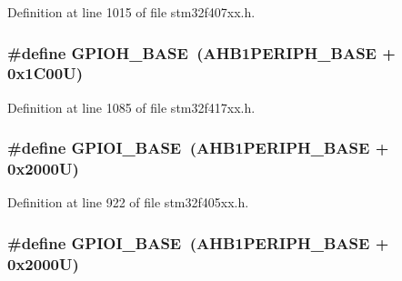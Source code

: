 Definition at line 1015 of file stm32f407xx.\+h.

\subsubsection[{\texorpdfstring{G\+P\+I\+O\+H\+\_\+\+B\+A\+SE}{GPIOH_BASE}}]{\setlength{\rightskip}{0pt plus 5cm}\#define G\+P\+I\+O\+H\+\_\+\+B\+A\+SE~({\bf A\+H\+B1\+P\+E\+R\+I\+P\+H\+\_\+\+B\+A\+SE} + 0x1\+C00\+U)}\hypertarget{group___peripheral__registers__structures_gaee4716389f3a1c727495375b76645608}{}\label{group___peripheral__registers__structures_gaee4716389f3a1c727495375b76645608}


Definition at line 1085 of file stm32f417xx.\+h.

\subsubsection[{\texorpdfstring{G\+P\+I\+O\+I\+\_\+\+B\+A\+SE}{GPIOI_BASE}}]{\setlength{\rightskip}{0pt plus 5cm}\#define G\+P\+I\+O\+I\+\_\+\+B\+A\+SE~({\bf A\+H\+B1\+P\+E\+R\+I\+P\+H\+\_\+\+B\+A\+SE} + 0x2000\+U)}\hypertarget{group___peripheral__registers__structures_ga50acf918c2e1c4597d5ccfe25eb3ad3d}{}\label{group___peripheral__registers__structures_ga50acf918c2e1c4597d5ccfe25eb3ad3d}


Definition at line 922 of file stm32f405xx.\+h.

\subsubsection[{\texorpdfstring{G\+P\+I\+O\+I\+\_\+\+B\+A\+SE}{GPIOI_BASE}}]{\setlength{\rightskip}{0pt plus 5cm}\#define G\+P\+I\+O\+I\+\_\+\+B\+A\+SE~({\bf A\+H\+B1\+P\+E\+R\+I\+P\+H\+\_\+\+B\+A\+SE} + 0x2000\+U)}\hypertarget{group___peripheral__registers__structures_ga50acf918c2e1c4597d5ccfe25eb3ad3d}{}\label{group___peripheral__registers__structures_ga50acf918c2e1c4597d5ccfe25eb3ad3d}


